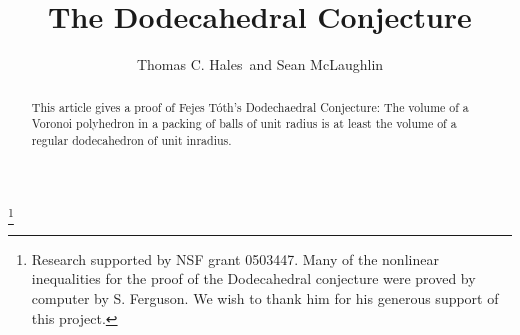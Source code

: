 \documentclass{article} %
\begin{document}
\raggedbottom

\title{The Dodecahedral Conjecture}
\author{Thomas C. Hales\ and Sean McLaughlin}
\maketitle

\begin{abstract}  
This article gives a proof of Fejes T\'oth's Dodechaedral Conjecture: The volume of a Voronoi polyhedron in a packing of balls of unit radius is at least the volume of a regular dodecahedron of unit inradius.
\end{abstract}




\thanks{Research supported by NSF grant 0503447.   Many of the nonlinear inequalities for the proof
of the Dodecahedral conjecture were proved by computer by S. Ferguson.  We
wish to thank him for his generous support of this project.}

\end{document}
